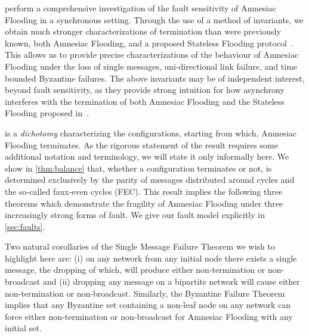  perform a comprehensive investigation of the fault sensitivity of Amnesiac Flooding in a synchronous setting. 
Through the use of a method of invariants, we obtain much stronger characterizations of termination than were previously known,  both Amnesiac Flooding, and a  proposed Stateless Flooding protocol~\cite{turau2020stateless}.  This allows us to provide precise characterizations of the behaviour of Amnesiac Flooding under the loss of single messages, uni-directional link failure, and time bounded Byzantine failures. 
The above invariants may be of independent interest, beyond fault sensitivity, as they provide strong intuition for how asynchrony interferes with the termination of both Amnesiac Flooding and the Stateless Flooding proposed in~\cite{turau2020stateless}.




  is a \textit{dichotomy} characterizing the configurations, starting from which, Amnesiac Flooding terminates. 
As the rigorous statement of the result requires some additional notation and terminology, we will state it only informally here. 
We show in \cref{thm:balance} that, whether a configuration terminates or not, is determined exclusively by the parity of messages distributed around cycles and the so-called faux-even cycles (FEC). 
This result implies the following three theorems which demonstrate the fragility of Amnesiac Flooding under three increasingly strong forms of fault.  We give our fault model explicitly in \cref{sec:faults}.



Two natural corollaries of the Single Message Failure Theorem we wish to highlight here are: (i) on any network from any initial node there exists a single message, the dropping of which, will produce either non-termination or non-broadcast and (ii) dropping any message on a bipartite network will cause either non-termination or non-broadcast.
Similarly, the Byzantine Failure Theorem implies that any Byzantine set containing a non-leaf node on any network can force either non-termination or non-broadcast for Amnesiac Flooding with any initial set.\\

